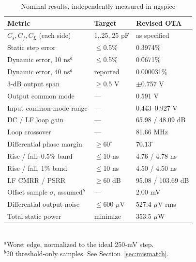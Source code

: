 \documentclass[10pt,journal]{IEEEtran}
\begin{document}
\begin{table}[h]
\caption{Nominal results, independently measured in ngspice}
\centering
\begin{tabular}{@{}lll@{}}\toprule
Metric & Target & Revised OTA \\ \midrule
$C_s,C_f,C_L$ (each side) & 1,.25,.25 pF & as specified \\
Static step error & $\leq$0.5\% & 0.3974\% \\
Dynamic error, 10 ns$^a$ & $\leq$0.5\% & 0.0671\% \\
Dynamic error, 40 ns$^a$ & reported & 0.000031\% \\
3-dB output span & $\geq$0.5 V & $\pm$0.757 V \\
Output common mode & --- & 0.591 V \\
Input common-mode range & --- & 0.443--0.927 V \\
DC / LF loop gain & --- & 65.98 / 48.09 dB \\
Loop crossover & --- & 81.66 MHz \\
Differential phase margin & $\geq 60^\circ$ & $70.13^\circ$ \\
Rise / fall, 0.5\% band & $\leq$10 ns & 4.76 / 4.78 ns \\
Rise / fall, 1\% band & $\leq$10 ns & 4.50 / 4.50 ns \\
LF CMRR / PSRR & $\geq$60 dB & 95.08 / 103.69 dB \\
Offset sample $\sigma$, assumed$^b$ & --- & 2.00 mV \\
Differential output noise & $\leq$600 $\mu$V & 527.4 $\mu$V rms \\
Total static power & minimize & 353.5 $\mu$W \\ \bottomrule
\end{tabular}\\[3pt]
$^a$Worst edge, normalized to the ideal 250-mV step.\\
$^b$20 threshold-only samples. See Section~\ref{sec:mismatch}.
\end{table}
\end{document}
